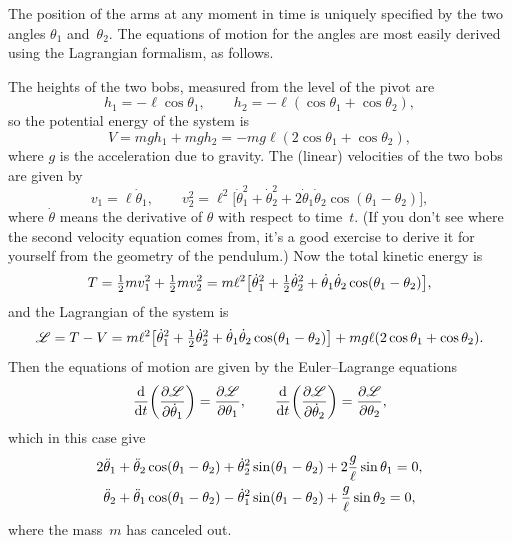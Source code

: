 \documentclass[12pt]{article}
\begin{document}
\begin{exercises}
\noindent The position of the arms at any moment in time is uniquely
specified by the two angles $\theta_1$ and~$\theta_2$.  The
equations of motion for the angles are most easily derived using the
Lagrangian formalism, as follows.

The heights of the two bobs, measured from the level of the pivot are
\begin{displaymath}
h_1 = -\ell\cos\theta_1, \qquad
h_2 = -\ell(\cos\theta_1+\cos\theta_2),
\end{displaymath}
so the potential energy of the system is
\begin{displaymath}
V = mgh_1 + mgh_2 = -mg\ell(2\cos\theta_1 + \cos\theta_2),
\end{displaymath}
where $g$ is the acceleration due to gravity.
The (linear) velocities of the two bobs are given by
\begin{displaymath}
v_1 = \ell\dot\theta_1, \qquad
v_2^2 = \ell^2 \bigl[ \dot\theta_1^2 + \dot\theta_2^2
  + 2 \dot\theta_1\dot\theta_2 \cos(\theta_1-\theta_2) \bigr],
\end{displaymath}
where $\dot\theta$ means the derivative of $\theta$ with respect to
time~$t$.  (If you don't see where the second velocity equation comes from,
it's a good exercise to derive it for yourself from the geometry of the
pendulum.)  Now the total kinetic energy is
\begin{displaymath}
T = \tfrac12 m v_1^2 + \tfrac12 m v_2^2
  = m\ell^2 \bigl[ \dot\theta_1^2 + \tfrac12 \dot\theta_2^2
  + \dot\theta_1\dot\theta_2 \cos(\theta_1-\theta_2) \bigr],
\end{displaymath}
and the Lagrangian of the system is
\begin{displaymath}
\mathcal{L} = T - V
  = m\ell^2 \bigl[ \dot\theta_1^2 + \tfrac12 \dot\theta_2^2
  + \dot\theta_1\dot\theta_2 \cos(\theta_1-\theta_2) \bigr]
  + mg\ell(2\cos\theta_1 + \cos\theta_2).
\end{displaymath}
Then the equations of motion are given by the Euler--Lagrange equations
\begin{displaymath}
{\mathrm{d}\over\mathrm{d}t} \biggl({\partial\mathcal{L}\over\partial\dot\theta_1} \biggr)
  = {\partial\mathcal{L}\over\partial\theta_1}, \qquad
{\mathrm{d}\over\mathrm{d}t} \biggl({\partial\mathcal{L}\over\partial\dot\theta_2} \biggr)
  = {\partial\mathcal{L}\over\partial\theta_2},
\end{displaymath}
which in this case give
\begin{align*}
2\ddot\theta_1 + \ddot\theta_2 \cos(\theta_1-\theta_2)
  &+ \dot\theta_2^2 \sin(\theta_1-\theta_2) + 2{g\over\ell} \sin\theta_1 = 0,
  \\
\ddot\theta_2 + \ddot\theta_1 \cos(\theta_1-\theta_2)
  &- \dot\theta_1^2 \sin(\theta_1-\theta_2) + {g\over\ell} \sin\theta_2 = 0,
\end{align*}
where the mass~$m$ has canceled out.


\end{exercises}
\end{document}

